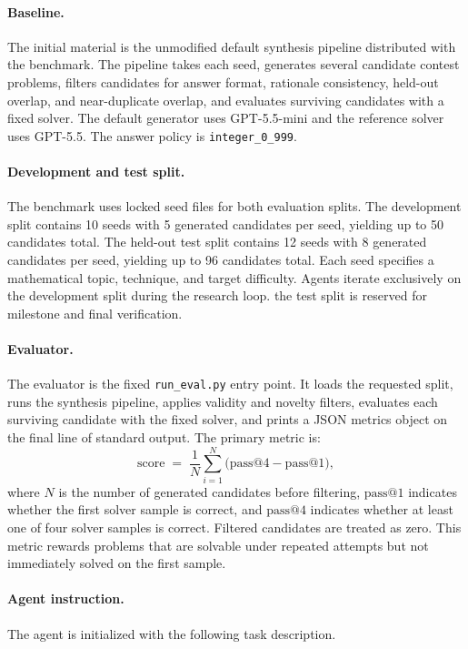 \paragraph{Baseline.}
The initial material is the unmodified default synthesis pipeline distributed
with the benchmark.
The pipeline takes each seed, generates several candidate contest problems,
filters candidates for answer format, rationale consistency, held-out overlap,
and near-duplicate overlap, and evaluates surviving candidates with a fixed
solver.
The default generator uses GPT-5.5-mini and the reference solver uses GPT-5.5.
The answer policy is \texttt{integer\_0\_999}.

\paragraph{Development and test split.}
The benchmark uses locked seed files for both evaluation splits.
The development split contains 10 seeds with 5 generated candidates per seed,
yielding up to 50 candidates total.
The held-out test split contains 12 seeds with 8 generated candidates per seed,
yielding up to 96 candidates total.
Each seed specifies a mathematical topic, technique, and target difficulty.
Agents iterate exclusively on the development split during the research loop.
the test split is reserved for milestone and final verification.

\paragraph{Evaluator.}
The evaluator is the fixed \texttt{run\_eval.py} entry point.
It loads the requested split, runs the synthesis pipeline, applies validity
and novelty filters, evaluates each surviving candidate with the fixed solver,
and prints a JSON metrics object on the final line of standard output.
The primary metric is:
\[
\mathrm{score}
\;=\;
\frac{1}{N}
\sum_{i=1}^{N}
\bigl(\mathrm{pass@4} - \mathrm{pass@1}\bigr),
\]
where $N$ is the number of generated candidates before filtering,
$\mathrm{pass@1}$ indicates whether the first solver sample is correct,
and $\mathrm{pass@4}$ indicates whether at least one of four solver
samples is correct.
Filtered candidates are treated as zero.
This metric rewards problems that are solvable under repeated attempts but
not immediately solved on the first sample.

\paragraph{Agent instruction.}
The agent is initialized with the following task description.

